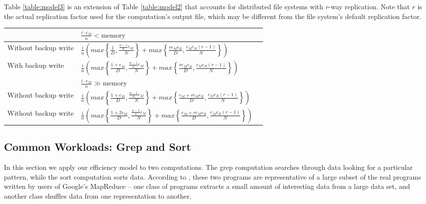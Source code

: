 \documentclass[ 11pt, letterpaper]{article}%
\begin{document}
Table \ref{table:model3} is an extension of Table \ref{table:model2} that
accounts for distributed file systems with $r$-way replication. Note that $r$
is the actual replication factor used for the computation's output file, which
may be different from the file system's default replication factor.

\begin{table*}
\centering
\renewcommand{\arraystretch}{1.2}
\begin{tabular}{|l|l|l|}
\hline
& $\frac{i \cdot e_M}{n}< \text{memory}$ \\ \hline
Without backup write &
$\frac{i}{n} \left( max\left\{\frac{1}{D}, \frac{\frac{n-1}{n} e_M}{N}\right\} +
max\left\{\frac{r e_M e_R}{D}, \frac{e_M e_R \left(r - 1\right)}{N}\right\} \right)$ \\ \hline
With backup write & $\frac{i}{n} \left( max\left\{\frac{1 + e_M}{D},
\frac{\frac{n-1}{n} e_M}{N}\right\} + max\left\{\frac{r e_M e_R}{D}, \frac{e_M
e_R \left(r - 1\right)}{N}\right\} \right)$ \\ \hline

& $\frac{i \cdot e_M}{n} \gg \text{memory}$ \\ \hline
Without backup write & $\frac{i}{n} \left( max\left\{\frac{1 + e_M}{D},
\frac{\frac{n-1}{n} e_M}{N}\right\} + max\left\{\frac{e_M + r e_M e_R}{D},
\frac{e_M e_R \left(r - 1\right)}{N}\right\} \right)$ \\ \hline
Without backup write & $\frac{i}{n} \left(
max\left\{\frac{1 + 2 e_M}{D}, \frac{\frac{n-1}{n} e_M}{N}\right\} +
max\left\{\frac{e_M + r e_M e_R}{D}, \frac{e_M e_R \left(r -
1\right)}{N}\right\} \right)$ \\ \hline

\end{tabular}
\caption{The execution time of a map-reduce computation on a parallel dataflow system in which output data is replicated across $r$ nodes.}
\label{table:model3}
\end{table*}

\subsection{Common Workloads: Grep and Sort}

In this section we apply our efficiency model to two computations. The grep
computation searches through data looking for a particular pattern, while the
sort computation sorts data. According to \cite{mapreduce}, these two programs
are representative of a large subset of the real programs written by users of
Google's MapReduce -- one class of programs extracts a small amount of
interesting data from a large data set, and another class shuffles data from
one representation to another.
\end{document}
